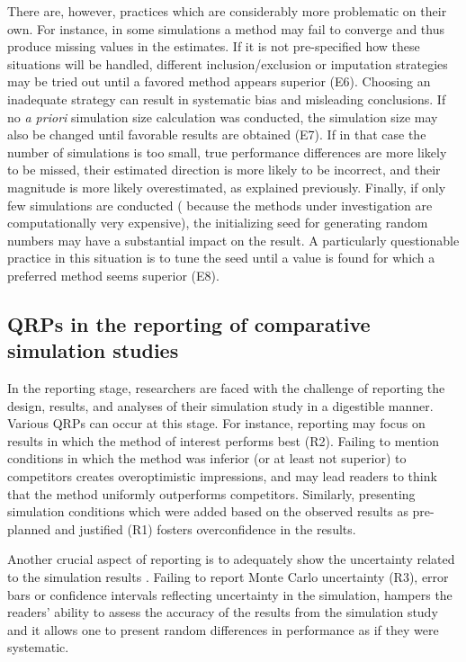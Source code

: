 \documentclass[a4paper, 11pt]{article}
\begin{document}
There are, however, practices which are considerably more problematic on their own.
For instance, in some simulations a method may fail to converge and thus produce missing values
in the estimates. If it is not pre-specified how these situations will be
handled, different inclusion/exclusion or imputation strategies may be tried out
until a favored method appears superior (E6). Choosing an inadequate strategy can result 
in systematic bias and misleading conclusions.
If no \emph{a priori} simulation size calculation was conducted, the simulation size may also
be changed until favorable results are obtained (E7).
If in that case the number of simulations is too small, true performance differences
are more likely to be missed, their estimated direction is more likely 
to be incorrect, and their magnitude
is more likely overestimated, as explained previously. 
Finally, if only few simulations are conducted (\eg{} because
the methods under investigation are computationally very expensive),
the initializing seed for generating 
random numbers may have a substantial impact on the result. A particularly
questionable practice in this situation is to tune the seed until
a value is found for which a preferred method seems superior (E8).


\subsection{QRPs in the reporting of comparative simulation studies}
In the reporting stage, researchers are faced with the challenge of reporting
the design, results, and analyses of their simulation study in a digestible
manner. Various QRPs can occur at this stage. For instance, 
reporting may focus on
results in which the method of interest performs best (R2).
Failing to mention conditions in which
the method was inferior (or at least not superior) to competitors creates
overoptimistic impressions, and may lead readers to think that the method
uniformly outperforms competitors. 
Similarly, presenting simulation conditions which were added
based on the observed results as pre-planned and justified (R1) fosters 
overconfidence in the results.

Another crucial aspect of reporting is to adequately show the uncertainty
related to the simulation results \citep{Hoaglin1975, van2019communicating}.
Failing to report Monte Carlo uncertainty (R3), \eg{} error bars or confidence
intervals reflecting uncertainty in the simulation, hampers the readers' ability to 
assess the accuracy of the results from the simulation study and
it allows one to present random differences in
performance as if they were systematic.
\end{document}
